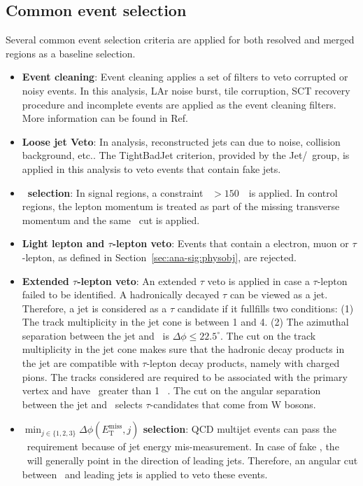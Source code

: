\subsection{Common event selection}
\par Several common event selection criteria are applied for both resolved and merged regions as a baseline selection.
\begin{itemize}
    \item \textbf{Event cleaning}: Event cleaning applies a set of filters to veto corrupted or noisy events. In this analysis, LAr noise burst, tile corruption, SCT recovery procedure and incomplete events are applied as the event cleaning filters. More information can be found in Ref\cite{c8-evt-cleaning}.
    \item \textbf{Loose jet Veto}: In analysis, reconstructed jets can due to noise, collision background, etc.. The TightBadJet criterion, provided by the Jet/\met~group, is applied in this analysis to veto events that contain fake jets.
    \item \textbf{\met~selection}: In signal regions, a constraint \met~$>150$~\GeV~is applied. In control regions, the lepton momentum is treated as part of the missing transverse momentum and the same \met~cut is applied.
    \item \textbf{Light lepton and $\tau$-lepton veto}: Events that contain a electron, muon or $\tau$-lepton, as defined in Section~\ref{sec:ana-sig:physobj}, are rejected.
    \item \textbf{Extended $\tau$-lepton veto}: An extended $\tau$ veto is applied in case a $\tau$-lepton failed to be identified. A hadronically decayed $\tau$ can be viewed as a jet. Therefore, a jet is considered as a $\tau$ candidate if it fullfills two conditions: (1) The track multiplicity in the jet cone is between 1 and 4. (2) The azimuthal separation between the jet and \met~is $\Delta \phi \leq 22.5^\circ$. The cut on the track multiplicity in the jet cone makes sure that the hadronic decay products in the jet are compatible with $\tau$-lepton decay products, namely with charged pions. The tracks considered are required to be associated with the primary vertex and have \pt~greater than 1 ~\GeV. The cut on the angular separation between the jet and \met~selects $\tau$-candidates that come from W bosons.
    \item \textbf{$\min_{j \in \{1,2,3\}}\Delta\phi(E_{\mathrm{T}}^{\mathrm{miss}},j)$ selection}: QCD multijet events can pass the \met~requirement because of jet energy mis-measurement. In case of fake \met, the \met~will generally point in the direction of leading jets. Therefore, an angular cut between \met~and leading jets is applied to veto these events.
\end{itemize}

